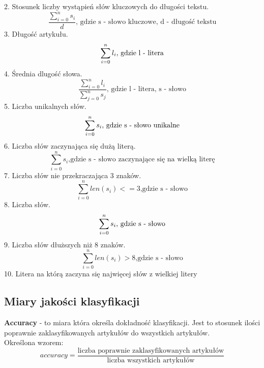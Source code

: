 \documentclass{classrep}
\begin{document}
2. Stosunek liczby wystąpień słów kluczowych do długości tekstu.\\
\begin{displaymath}
\frac{\sum_{i=0}^{n}s_i}{d}\textrm{, gdzie s - słowo kluczowe, d - długość tekstu}
\end{displaymath}
3. Długość artykułu.\\
\begin{displaymath}
\sum_{i = 0}^{n} l_i \textrm{, gdzie l - litera}\\
\end{displaymath}
4. Średnia dlugość słowa.\\
\begin{displaymath}
\frac{\sum_{i=0}^{n}l_i}{\sum_{j=0}^{n}s_j}\textrm{, gdzie l - litera, s - słowo}
\end{displaymath}
5. Liczba unikalnych słów.\\
\begin{displaymath}
\sum_{i = 0}^{n} s_i \textrm{, gdzie s - słowo unikalne}\\
\end{displaymath}
6. Liczba słów zaczynająca się dużą literą.\\
\begin{displaymath}
\sum_{i=0}^{n}s_i \textrm{,gdzie s - słowo zaczynające się na wielką literę}
\end{displaymath}
7. Liczba słów nie przekraczająca 3 znaków.\\
\begin{displaymath}
\sum_{i=0}^{n}len(s_i)<= 3 \textrm{,gdzie s - słowo}
\end{displaymath}
8. Liczba słów.\\
\begin{displaymath}
\sum_{i = 0}^{n} s_i \textrm{, gdzie s - słowo}\\
\end{displaymath}
9. Liczba słów dłuższych niż 8 znaków.\\
\begin{displaymath}
\sum_{i=0}^{n}len(s_i) > 8 \textrm{,gdzie s - słowo}
\end{displaymath}
10. Litera na którą zaczyna się najwięcej słów z wielkiej litery \\ 
\noindent

\subsection{Miary jakości klasyfikacji} 
{\bf Accuracy} - to miara która określa dokładność klasyfikacji. Jest to stosunek ilości poprawnie zaklasyfikowanych artykułów do wszystkich artykułów. \\
Określona wzorem:
\begin{displaymath}
accuracy = \frac{\textrm{liczba poprawnie zaklasyfikowanych artykułów}}{\textrm{liczba wszystkich artykułów}}
\end{displaymath}
\end{document}
